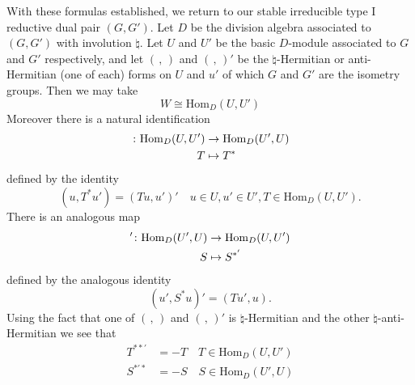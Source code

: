 \documentclass[12pt]{amsart}
\def\Hom{{\mathrm{Hom}}}
\def\inv{{\natural}}
\begin{document}
With these formulas established, we return to our stable irreducible type I
reductive dual pair $(G,G')$. Let $D$ be the division algebra
associated to $(G,G')$ with involution $\inv$. Let $U$ and $U'$
be the basic $D$-module associated to $G$ and $G'$ respectively, 
and let $(\,,\,)$ and $(\,,\,)'$ be the $\inv$-Hermitian or
anti-Hermitian (one of each) forms on $U$ and $u'$ of 
which $G$ and $G'$ are the isometry groups. Then we may take
\begin{equation}\label{eq:20}
W\cong \Hom_D(U,U')
\end{equation}
Moreover there is a natural identification
\[
\begin{split}
\* \colon \Hom_D(U,U') &\to \Hom_D(U',U)\\
T&\mapsto T^*
\end{split}
\]
defined by the identity
\begin{equation}\label{eq:21a}
(u,T^*u') = (Tu,u')' \quad u\in U, u'\in U', T\in \Hom_D(U,U').
\end{equation}
There is an analogous map 
\[
\begin{split}
\*' \colon \Hom_D(U',U) &\to \Hom_D(U,U')\\
S&\mapsto S^{*'}
\end{split}
\]
defined by the analogous identity
\begin{equation}\label{eq:21b}
(u',S^*u)' = (Tu',u).
\end{equation}
Using the fact that one of $(\,,\,)$ and $(\,,\,)'$ is $\inv$-Hermitian and
the other $\inv$-anti-Hermitian we see that 
\begin{equation}
\begin{split}
T^{**'} &= -T \quad T\in \Hom_D(U,U')\\
S^{*'*} &= -S \quad S\in \Hom_D(U',U)
\end{split}
\end{equation}




\end{document}
